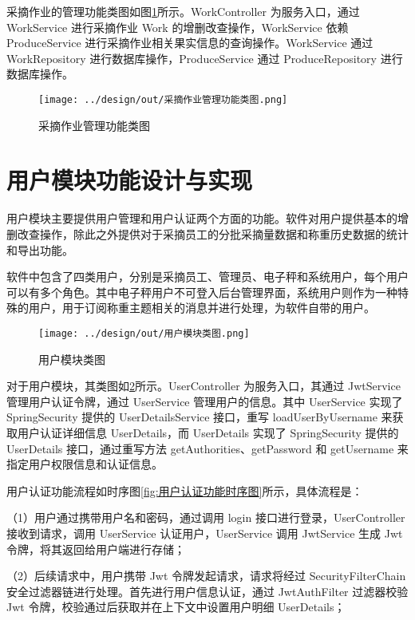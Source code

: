 采摘作业的管理功能类图如图\ref{fig:采摘作业管理功能类图}所示。WorkController 为服务入口，通过 WorkService 进行采摘作业 Work 的增删改查操作，WorkService 依赖 ProduceService 进行采摘作业相关果实信息的查询操作。WorkService 通过 WorkRepository 进行数据库操作，ProduceService 通过 ProduceRepository 进行数据库操作。

\begin{figure}
    \centering
    \texttt{[image: ../design/out/采摘作业管理功能类图.png]}
    \caption{采摘作业管理功能类图}
    \label{fig:采摘作业管理功能类图}
\end{figure}

\section{用户模块功能设计与实现}\label{sec:user-mode}

用户模块主要提供用户管理和用户认证两个方面的功能。软件对用户提供基本的增删改查操作，除此之外提供对于采摘员工的分批采摘量数据和称重历史数据的统计和导出功能。

软件中包含了四类用户，分别是采摘员工、管理员、电子秤和系统用户，每个用户可以有多个角色。其中电子秤用户不可登入后台管理界面，系统用户则作为一种特殊的用户，用于订阅称重主题相关的消息并进行处理，为软件自带的用户。

\begin{figure}
    \centering
    \texttt{[image: ../design/out/用户模块类图.png]}
    \caption{用户模块类图}
    \label{fig:用户模块类图}
\end{figure}

对于用户模块，其类图如\ref{fig:用户模块类图}所示。UserController 为服务入口，其通过 JwtService 管理用户认证令牌，通过 UserService 管理用户的信息。其中 UserService 实现了 SpringSecurity 提供的 UserDetailsService 接口，重写 loadUserByUsername 来获取用户认证详细信息 UserDetails，而 UserDetails 实现了 SpringSecurity 提供的 UserDetails 接口，通过重写方法 getAuthorities、getPassword 和 getUsername 来指定用户权限信息和认证信息。

用户认证功能流程如时序图\ref{fig:用户认证功能时序图}所示，具体流程是：

（1）用户通过携带用户名和密码，通过调用 login 接口进行登录，UserController 接收到请求，调用 UserService 认证用户，UserService 调用 JwtService 生成 Jwt 令牌，将其返回给用户端进行存储；

（2）后续请求中，用户携带 Jwt 令牌发起请求，请求将经过 SecurityFilterChain 安全过滤器链进行处理。首先进行用户信息认证，通过 JwtAuthFilter 过滤器校验 Jwt 令牌，校验通过后获取并在上下文中设置用户明细 UserDetails；


